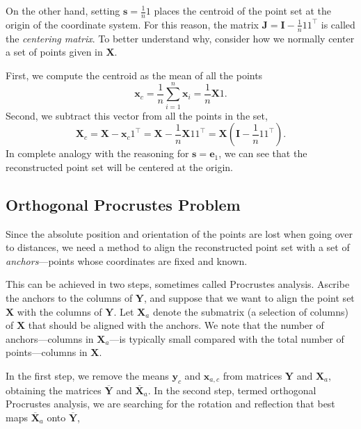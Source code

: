 \documentclass[10pt,double]{IEEEtran}
\renewcommand{\vec}[1]{\ensuremath{\boldsymbol{#1}}}
\providecommand{\mat}[1]{\ensuremath{\boldsymbol{#1}}}
\providecommand{\mI}{\mat{I}} \providecommand{\mJ}{\mat{J}}
\providecommand{\mX}{\mat{X}}\providecommand{\mY}{\mat{Y}}
\providecommand{\ve}{\vec{e}} \providecommand{\vf}{\vec{f}}
\providecommand{\vs}{\vec{s}}
\providecommand{\vx}{\vec{x}} \providecommand{\vy}{\vec{y}}
\newcommand{\vone}{\ensuremath{\vec{\mathit{1}}}}
\newcommand{\T}{\ensuremath{\top}}
\newcommand{\rev}[1]{{#1}}
\begin{document}
On the other hand, setting $\vs = \frac{1}{n} \vone$ places the centroid of
the point set at the origin of the coordinate system. For this reason, the
matrix $\mJ = \mI -
\frac{1}{n}\vone \vone^\T$ is called the \emph{centering matrix}. To better
understand why, consider how we normally center a set of points given in
$\mX$. 

First, we compute the centroid as the mean of all the points
\begin{equation}
	\vx_c = \frac{1}{n}\sum_{i=1}^n \vx_i = \frac{1}{n} \mX \vone.
\end{equation}
Second, we subtract this vector from all the points in the set,
\begin{equation}
	\label{eq:centering_derivation}
	\mX_c = \mX - \vx_c \vone^\T = \mX - \frac{1}{n} \mX \vone \vone^\T = \mX (\mI
	- \frac{1}{n} \vone \vone^\T).
\end{equation}
In complete analogy with the reasoning for $\vs = \ve_1$, we can see that the
reconstructed point set will be centered at the origin.


\subsection{Orthogonal Procrustes Problem}

Since the absolute position and orientation of the points are lost when going
over to distances, we need a method to align the reconstructed point set with
a set of \emph{anchors}---points whose coordinates are fixed and known.

This can be achieved in two steps, sometimes called Procrustes analysis.
Ascribe the anchors to the columns of $\mY$, and suppose that we want to align
the point set $\mX$ with the columns of $\mY$. \rev{Let $\mX_a$ denote the
submatrix (a selection of columns) of $\mX$ that should be aligned with the
anchors. We note that the number of anchors---columns in $\mX_a$---is typically
small compared with the total number of points---columns in $\mX$.}

In the first step, we remove the means $\vy_c$ and $\vx_{a,c}$ from matrices
$\mY$ and $\mX_a$, obtaining the matrices $\overline{\mY}$ and
$\overline{\mX}_a$. In the second step, termed orthogonal Procrustes analysis,
we are searching for the rotation and reflection that best maps
$\overline{\mX}_a$ onto $\overline{\mY}$,
\end{document}
